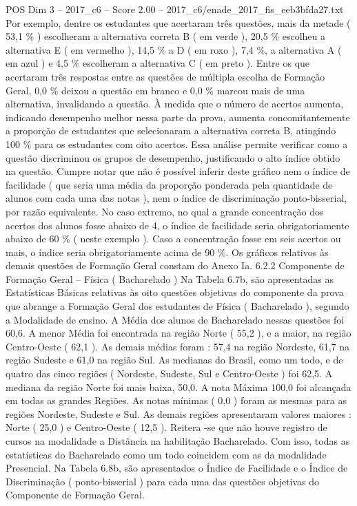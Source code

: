 \begin{textsample}{POS Dim 3 – 2017\_c6 – Score 2.00 – 2017\_c6/enade\_2017\_fis\_eeb3bfda27.txt}
Por exemplo, dentre os estudantes que acertaram três questões, mais da metade ( 53,1 \% ) escolheram a alternativa correta B ( em verde ), 20,5 \% escolheu a alternativa E ( em vermelho ), 14,5 \% a D ( em roxo ), 7,4 \%, a alternativa A ( em azul ) e 4,5 \% escolheram a alternativa C ( em preto ).
Entre os que acertaram três respostas entre as questões de múltipla escolha de Formação Geral, 0,0 \% deixou a questão em branco e 0,0 \% marcou mais de uma alternativa, invalidando a questão.
À medida que o número de acertos aumenta, indicando desempenho melhor nessa parte da prova, aumenta concomitantemente a proporção de estudantes que selecionaram a alternativa correta B, atingindo 100 \% para os estudantes com oito acertos.
Essa análise permite verificar como a questão discriminou os grupos de desempenho, justificando o alto índice obtido na questão.
Cumpre notar que não é possível inferir deste gráfico nem o índice de facilidade ( que seria uma média da proporção ponderada pela quantidade de alunos com cada uma das notas ), nem o índice de discriminação ponto-bisserial, por razão equivalente.
No caso extremo, no qual a grande concentração dos acertos dos alunos fosse abaixo de 4, o índice de facilidade seria obrigatoriamente abaixo de 60 \% ( neste exemplo ).
Caso a concentração fosse em seis acertos ou mais, o índice seria obrigatoriamente acima de 90 \%.
Os gráficos relativos às demais questões de Formação Geral constam do Anexo Ia. 6.2.2 Componente de Formação Geral – Física ( Bacharelado ) Na Tabela 6.7b, são apresentadas as Estatísticas Básicas relativas às oito questões objetivas do componente da prova que abrange a Formação Geral dos estudantes de Física ( Bacharelado ), segundo a Modalidade de ensino.
A Média dos alunos de Bacharelado nessas questões foi 60,6.
A menor Média foi encontrada na região Norte ( 55,2 ), e a maior, na região Centro-Oeste ( 62,1 ).
As demais médias foram : 57,4 na região Nordeste, 61,7 na região Sudeste e 61,0 na região Sul.
As medianas do Brasil, como um todo, e de quatro das cinco regiões ( Nordeste, Sudeste, Sul e Centro-Oeste ) foi 62,5.
A mediana da região Norte foi mais baixa, 50,0.
A nota Máxima 100,0 foi alcançada em todas as grandes Regiões.
As notas mínimas ( 0,0 ) foram as mesmas para as regiões Nordeste, Sudeste e Sul.
As demais regiões apresentaram valores maiores : Norte ( 25,0 ) e Centro-Oeste ( 12,5 ).
Reitera -se que não houve registro de cursos na modalidade a Distância na habilitação Bacharelado.
Com isso, todas as estatísticas do Bacharelado como um todo coincidem com as da modalidade Presencial.
Na Tabela 6.8b, são apresentados o Índice de Facilidade e o Índice de Discriminação ( ponto-bisserial ) para cada uma das questões objetivas do Componente de Formação Geral.

\end{textsample}
